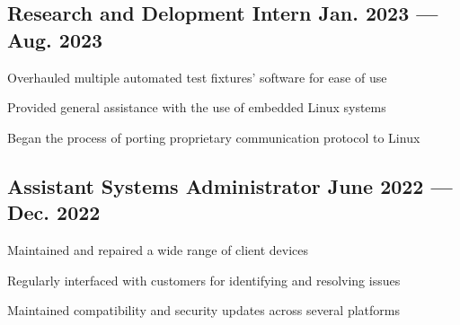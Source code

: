 \subsection{{Research and Delopment Intern \hfill Jan. 2023 --- Aug. 2023}}
\begin{zitemize}
\item Overhauled multiple automated test fixtures' software for ease of use
\item Provided general assistance with the use of embedded Linux systems
\item Began the process of porting proprietary communication protocol to Linux
\end{zitemize}

\subsection{{Assistant Systems Administrator \hfill June 2022 --- Dec. 2022}}
\begin{zitemize}
\item Maintained and repaired a wide range of client devices
\item Regularly interfaced with customers for identifying and resolving issues
\item Maintained compatibility and security updates across several platforms
\end{zitemize}
